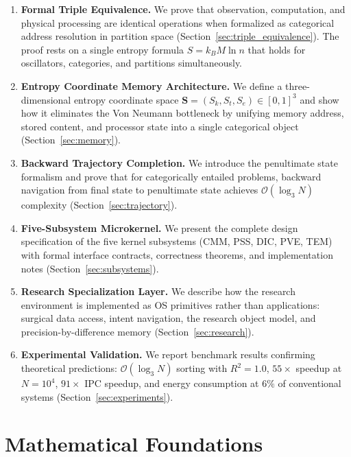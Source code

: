 \documentclass[12pt,twocolumn]{article}
\begin{document}
\begin{enumerate}[leftmargin=*]
\item \textbf{Formal Triple Equivalence.} We prove that observation, computation, and physical processing are identical operations when formalized as categorical address resolution in partition space (Section~\ref{sec:triple_equivalence}). The proof rests on a single entropy formula $S = k_B M \ln n$ that holds for oscillators, categories, and partitions simultaneously.

\item \textbf{Entropy Coordinate Memory Architecture.} We define a three-dimensional entropy coordinate space $\mathbf{S} = (S_k, S_t, S_e) \in [0,1]^3$ and show how it eliminates the Von Neumann bottleneck by unifying memory address, stored content, and processor state into a single categorical object (Section~\ref{sec:memory}).

\item \textbf{Backward Trajectory Completion.} We introduce the penultimate state formalism and prove that for categorically entailed problems, backward navigation from final state to penultimate state achieves $\mathcal{O}(\log_3 N)$ complexity (Section~\ref{sec:trajectory}).

\item \textbf{Five-Subsystem Microkernel.} We present the complete design specification of the five kernel subsystems (CMM, PSS, DIC, PVE, TEM) with formal interface contracts, correctness theorems, and implementation notes (Section~\ref{sec:subsystems}).

\item \textbf{Research Specialization Layer.} We describe how the research environment is implemented as OS primitives rather than applications: surgical data access, intent navigation, the research object model, and precision-by-difference memory (Section~\ref{sec:research}).

\item \textbf{Experimental Validation.} We report benchmark results confirming theoretical predictions: $\mathcal{O}(\log_3 N)$ sorting with $R^2 = 1.0$, $55\times$ speedup at $N = 10^4$, $91\times$ IPC speedup, and energy consumption at $6\%$ of conventional systems (Section~\ref{sec:experiments}).
\end{enumerate}

\section{Mathematical Foundations}
\label{sec:foundations}
\end{document}
